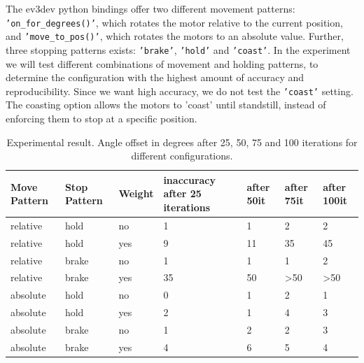 \documentclass[11pt, a4paper]{article}
\begin{document}
The ev3dev python bindings offer two different movement patterns: \texttt{'on\_for\_degrees()'}, which rotates the motor relative to the current position, and \texttt{'move\_to\_pos()'}, which rotates the motors to an absolute value.  Further, three stopping patterns exists: \texttt{'brake'}, \texttt{'hold'} and \texttt{'coast'}. In the experiment we will test different combinations of movement and holding patterns, to determine the configuration with the highest amount of accuracy and reproducibility. Since we want high accuracy, we do not test the \texttt{'coast'} setting. The coasting option allows the motors to 'coast' until standstill, instead of enforcing them to stop at a specific position. 


\begin{table}[H]
	\centering
	\begin{tabular}{|l|l|l|l|l|l|l|}
		\hline
		Move Pattern & Stop Pattern & Weight & inaccuracy after 25 iterations & after 50it & after 75it             & after 100it            \\ \hline \hline
		relative   & hold         & no     & 1\degree             & 1\degree    & 2\degree                & 2\degree                \\ \hline
		relative   & hold         & yes    & 9\degree             & 11\degree   & 35\degree               & 45\degree               \\ \hline
		relative   & brake        & no     & 1\degree             & 1\degree    & 1\degree                & 2\degree                \\ \hline
		relative   & brake        & yes    & 35\degree            & 50\degree   & \textgreater{}50\degree & \textgreater{}50\degree \\ \hline
		absolute     & hold         & no     & 0\degree             & 1\degree    & 2\degree                & 1\degree                \\ \hline
		absolute     & hold         & yes    & 2\degree             & 1\degree    & 4\degree                & 3\degree                \\ \hline
		absolute     & brake        & no     & 1\degree             & 2\degree    & 2\degree                & 3\degree                \\ \hline
		absolute     & brake        & yes    & 4\degree             & 6\degree    & 5\degree                & 4\degree                \\ \hline
	\end{tabular}
	\caption{Experimental result. Angle offset in degrees after 25, 50, 75 and 100 iterations for different configurations.}
	\label{tab:angle_experiment}
\end{table}
\end{document}
